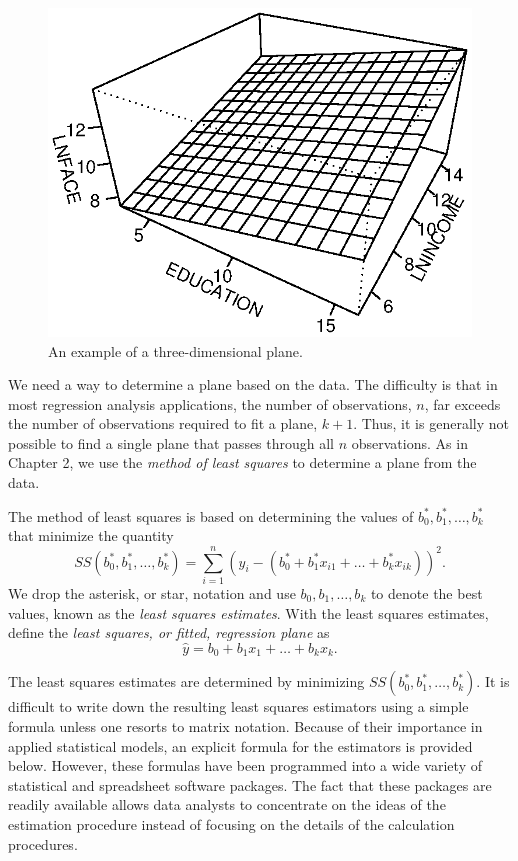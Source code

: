 \begin{figure}[htp]
  \begin{center}
    \includegraphics[width=.5\textwidth]{Chapter3/F33DPlane.eps}
    \caption{\label{F3:3DPlane} \small  An example of a three-dimensional plane.}
  \end{center}
\end{figure}

We need a way to determine a plane based on the data. The difficulty
is that in most regression analysis applications, the number of
observations, $n$, far exceeds the number of observations required
to fit a plane, $k+1$. Thus, it is generally not possible to find a
single plane that passes through all $n$ observations. As in Chapter
2, we use the \emph{method of least squares} to determine a plane
from the data.

The method of least squares is based on determining the values of $
b_0^{\ast},b_1^{\ast},\ldots,b_k^{\ast}$ that minimize the quantity
\begin{equation}\label{E3:SSBasic}
SS(b_0^{\ast},b_1^{\ast},\ldots,b_k^{\ast})=\sum_{i=1}^{n}\left(
y_i-\left(
b_0^{\ast}+b_1^{\ast}x_{i1}+\ldots+b_k^{\ast}x_{ik}\right) \right)
^2.
\end{equation}
We drop the asterisk, or star, notation and use $b_0, b_1, \ldots,
b_k$ to denote the best values, known as the \emph{least squares
estimates}. With the least squares estimates, define the \emph{least
squares, or fitted, regression plane} as
\begin{equation*}
\widehat{y} = b_0 + b_1 x_1 + \ldots + b_k x_k.
\end{equation*}

The least squares estimates are determined by minimizing
$SS(b_0^{\ast},b_1^{\ast},\ldots,b_k^{\ast})$. It is difficult to
write down the resulting least squares estimators using a simple
formula unless one resorts to matrix notation. Because of their
importance in applied statistical models, an explicit formula for
the estimators is provided below. However, these formulas have been
programmed into a wide variety of statistical and spreadsheet
software packages. The fact that these packages are readily
available allows data analysts to concentrate on the ideas of the
estimation procedure instead of focusing on the details of the
calculation procedures.

